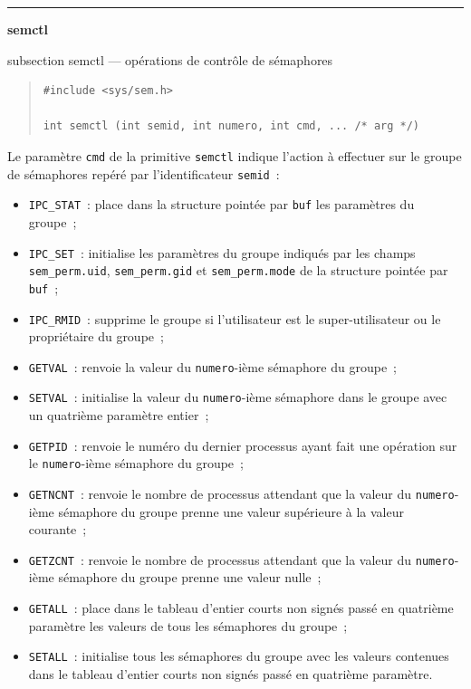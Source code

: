 \documentclass [twoside] {report}
\newcommand {\primitive} [1]
    {
	\phantomsection
	{\large \textbf {#1}}
	\addcontentsline {toc} {subsection} {#1}
    }
\newcommand {\separation}
    {
	\vspace {5mm}
	\nopagebreak
	\hrule
    }
\begin{document}
\separation
\primitive {semctl} --- opérations de contrôle de sémaphores

\begin {quote}
\begin {verbatim}
#include <sys/sem.h>

int semctl (int semid, int numero, int cmd, ... /* arg */)
\end{verbatim}
\end {quote}

Le paramètre \texttt {cmd} de la primitive \texttt {semctl} indique l'action à
effectuer sur le groupe de sémaphores repéré par l'identificateur
\texttt {semid}~:

\begin {itemize}
    \item \texttt {IPC\_STAT}~: place dans la structure pointée par
	\texttt {buf} les paramètres du groupe~;
    \item \texttt {IPC\_SET}~: initialise les paramètres du groupe
	indiqués par les champs \texttt {sem\_perm.uid}, \texttt {sem\_perm.gid}
	et \texttt {sem\_perm.mode} de la structure pointée par \texttt {buf}~;
    \item \texttt {IPC\_RMID}~: supprime le groupe si l'utilisateur est le
	super-utilisateur ou le propriétaire du groupe~;
    \item \texttt {GETVAL}~:  renvoie la valeur du \texttt {numero}-ième
	sémaphore du groupe~;
    \item \texttt {SETVAL}~: initialise la valeur du \texttt {numero}-ième
	sémaphore dans le groupe avec un quatrième paramètre entier~;
    \item \texttt {GETPID}~: renvoie le numéro du dernier processus ayant
	fait une opération sur le \texttt {numero}-ième sémaphore du
	groupe~;
    \item \texttt {GETNCNT}~: renvoie le nombre de processus attendant que
	la valeur du \texttt {numero}-ième sémaphore du groupe prenne une
	valeur supérieure à la valeur courante~;
    \item \texttt {GETZCNT}~: renvoie le nombre de processus attendant que
	la valeur du \texttt {numero}-ième sémaphore du groupe prenne une
	valeur nulle~;
    \item \texttt {GETALL}~: place dans le tableau d'entier courts non
	signés passé en quatrième paramètre les valeurs de tous les
	sémaphores du groupe~;
    \item \texttt {SETALL}~: initialise tous les sémaphores du groupe avec
	les valeurs contenues dans le tableau d'entier courts non
	signés passé en quatrième paramètre.
\end {itemize}
\end{document}

